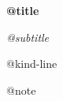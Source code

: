 \vspace*{0.12\textheight}
{\Huge\bfseries @{title}\par}
\vspace{0.35em}
{\Large\itshape @{subtitle}\par}
\vspace{0.8em}
{\large @{kind-line}\par}
\vfill
{\small @{note}\par}
